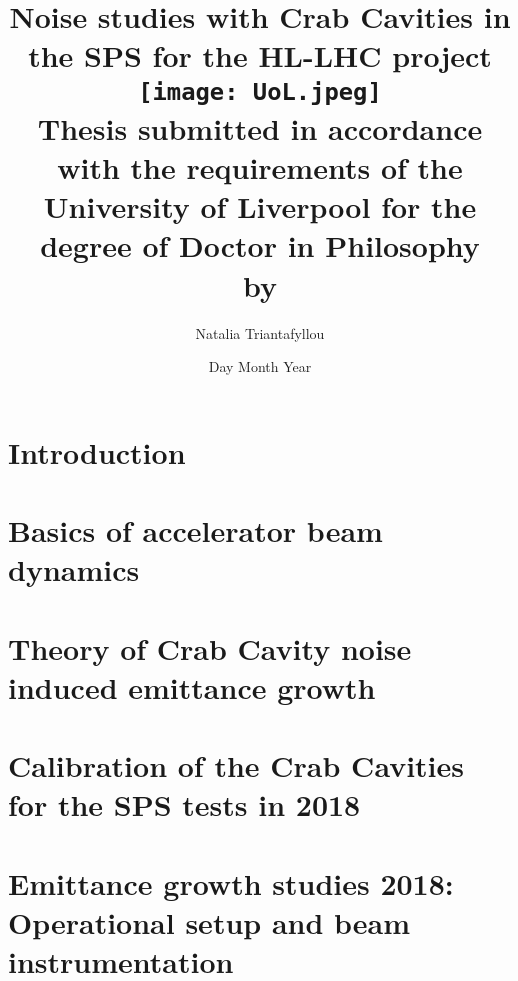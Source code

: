 \documentclass[12pt,twoside]{report} %
\begin{document}
\frontmatter
\title{
{Noise studies with Crab Cavities in the SPS for the HL-LHC project}\\
{\texttt{[image: UoL.jpeg]}} \\
{\large Thesis submitted in accordance with the requirements of the University of Liverpool for the degree of Doctor in Philosophy \\ by}
}
\author{ Natalia Triantafyllou}
\date{Day Month Year}
\maketitle
\newpage




\listoffigures
{}
\listoftables
{}

\newpage

\thispagestyle{plain} %

\listofsymbols
{}

\tableofcontents

\mainmatter

\chapter{Introduction}


\chapter{Basics of accelerator beam dynamics}


\chapter{Theory of Crab Cavity noise induced emittance growth}\label{Ch:CC_noise_theory}


\chapter{Calibration of the Crab Cavities for the SPS tests in 2018}\label{Ch:CC_set_up}


\chapter{Emittance growth studies 2018: Operational setup and beam instrumentation}\label{Ch:2018_setup}

\end{document}
